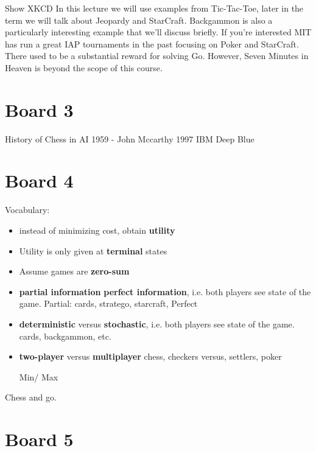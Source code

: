 \documentclass[11pt]{article}
\begin{document}
Show XKCD
\noindent In this lecture we will use examples from Tic-Tac-Toe, later in the term we will talk about Jeopardy and StarCraft. Backgammon is also a particularly interesting example that we'll discuss briefly. If you're interested MIT has run a great IAP tournaments in the past focusing on Poker and StarCraft. There used to be a substantial reward for solving Go. However, Seven Minutes in Heaven is beyond the scope of this course.

\section{Board 3}

History of Chess in AI
1959 - John Mccarthy
1997 IBM Deep Blue

\section{Board 4}
Vocabulary: 


\begin{itemize}
\item  instead of minimizing cost, obtain \textbf{utility} 
\item  Utility is only given at \textbf{terminal} states
\item Assume games are \textbf{zero-sum}
\item \textbf{partial information} \textbf{perfect information}, i.e. both players see state of the game. Partial: cards, stratego, starcraft, Perfect
\item \textbf{deterministic} versus \textbf{stochastic}, i.e. both players see state of the game. cards, backgammon, etc. 
\item \textbf{two-player} versus \textbf{multiplayer} chess, checkers versus, settlers, poker

Min/ Max

\end{itemize}

Chess and go. 

\section{Board 5}
\end{document}
